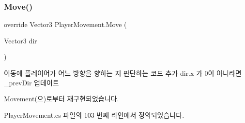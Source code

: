 \subsubsection{\texorpdfstring{Move()}{Move()}\hspace{0.1cm}{\footnotesize\ttfamily [2/2]}}
{\footnotesize\ttfamily override Vector3 Player\+Movement.\+Move (\begin{DoxyParamCaption}\item[{Vector3}]{dir }\end{DoxyParamCaption})\hspace{0.3cm}{\ttfamily [virtual]}}



이동에 플레이어가 어느 방향을 향하는 지 판단하는 코드 추가 dir.\+x 가 0이 아니라면 \+\_\+prev\+Dir 업데이트 



\mbox{\hyperlink{class_movement_a0a304da685db92346b7e274c2b0f023e}{Movement}}(으)로부터 재구현되었습니다.



Player\+Movement.\+cs 파일의 103 번째 라인에서 정의되었습니다.


